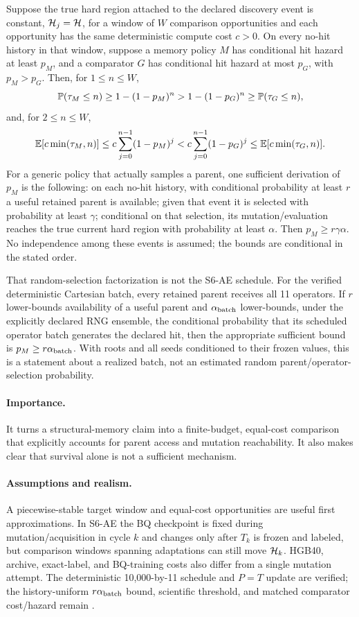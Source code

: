 \begin{proposition}
\label{prop:window}
Suppose the true hard region attached to the declared discovery event is
constant, $\mathcal{H}_j=\mathcal{H}$, for a window of $W$ comparison opportunities and
each opportunity has the same deterministic compute cost
$c>0$. On every no-hit history in that window, suppose a memory policy $M$
has conditional hit hazard at least $p_M$, and a comparator $G$ has
conditional hit hazard at most $p_G$, with $p_M>p_G$. Then, for
$1\leq n\leq W$,
\[
 \mathbb{P}(\tau_M\leq n)\geq 1-(1-p_M)^n
 > 1-(1-p_G)^n\geq \mathbb{P}(\tau_G\leq n),
\]
and, for $2\leq n\leq W$,
\[
 \mathbb{E}[c\min(\tau_M,n)]
 \leq c\sum_{j=0}^{n-1}(1-p_M)^j
 < c\sum_{j=0}^{n-1}(1-p_G)^j
 \leq \mathbb{E}[c\min(\tau_G,n)].
\]
For a generic policy that actually samples a parent, one sufficient
derivation of $p_M$ is the following: on each no-hit history,
with conditional probability at least $r$ a useful retained parent is
available; given that event it is selected with probability at least
$\gamma$; conditional on that selection, its mutation/evaluation reaches the
true current hard region with probability at least $\alpha$. Then
$p_M\geq r\gamma\alpha$. No independence among these events is assumed;
the bounds are conditional in the stated order.

That random-selection factorization is not the S6-AE schedule. For the
verified deterministic Cartesian batch, every retained parent receives all
11 operators. If $r$ lower-bounds availability of a useful parent and
$\alpha_{\rm batch}$ lower-bounds, under the explicitly declared RNG
ensemble, the conditional probability that its scheduled operator batch
generates the declared hit, then the appropriate sufficient bound is
$p_M\geq r\alpha_{\rm batch}$. With roots and all seeds conditioned to their
frozen values, this is a statement about a realized batch, not an estimated
random parent/operator-selection probability.
\end{proposition}

\paragraph{Importance.} It turns a structural-memory claim into a finite-budget,
equal-cost comparison that explicitly accounts for parent access and mutation
reachability. It also makes clear that survival alone is not a sufficient
mechanism.

\paragraph{Assumptions and realism.} A piecewise-stable target window and
equal-cost opportunities are useful first approximations. In S6-AE the BQ
checkpoint is fixed during mutation/acquisition in cycle $k$ and changes only
after $T_k$ is frozen and labeled, but comparison windows spanning adaptations
can still move $\mathcal{H}_k$. HGB40, archive, exact-label, and BQ-training costs
also differ from a single mutation attempt. The deterministic 10,000-by-11
schedule and $P=T$ update are verified; the history-uniform
$r\alpha_{\rm batch}$ bound, scientific threshold, and matched comparator
cost/hazard remain .

